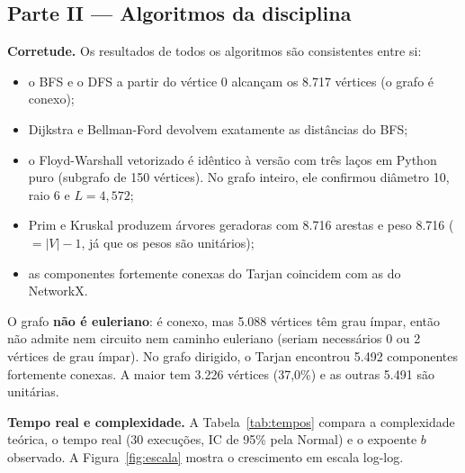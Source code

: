 \documentclass[sigconf]{webmedia}
\begin{document}
\subsection{Parte II --- Algoritmos da disciplina}\label{sec:p2}
\textbf{Corretude.} Os resultados de todos os algoritmos são consistentes entre si:
\begin{itemize}
  \item o BFS e o DFS a partir do vértice 0 alcançam os 8.717 vértices (o grafo é conexo);
  \item Dijkstra e Bellman-Ford devolvem exatamente as distâncias do BFS;
  \item o Floyd-Warshall vetorizado é idêntico à versão com três laços em Python
  puro (subgrafo de 150 vértices). No grafo inteiro, ele confirmou diâmetro 10,
  raio 6 e $L=4{,}572$;
  \item Prim e Kruskal produzem árvores geradoras com 8.716 arestas e peso 8.716
  ($=|V|-1$, já que os pesos são unitários);
  \item as componentes fortemente conexas do Tarjan coincidem com as do NetworkX.
\end{itemize}

O grafo \textbf{não é euleriano}: é conexo, mas 5.088 vértices têm grau ímpar, então
não admite nem circuito nem caminho euleriano (seriam necessários 0 ou 2 vértices
de grau ímpar). No grafo dirigido, o Tarjan encontrou 5.492 componentes fortemente
conexas. A maior tem 3.226 vértices (37,0\%) e as outras 5.491 são unitárias.

\textbf{Tempo real e complexidade.} A Tabela~\ref{tab:tempos} compara a
complexidade teórica, o tempo real (30 execuções, IC de 95\% pela Normal) e o
expoente $b$ observado. A Figura~\ref{fig:escala} mostra o crescimento em escala
log-log.
\end{document}
